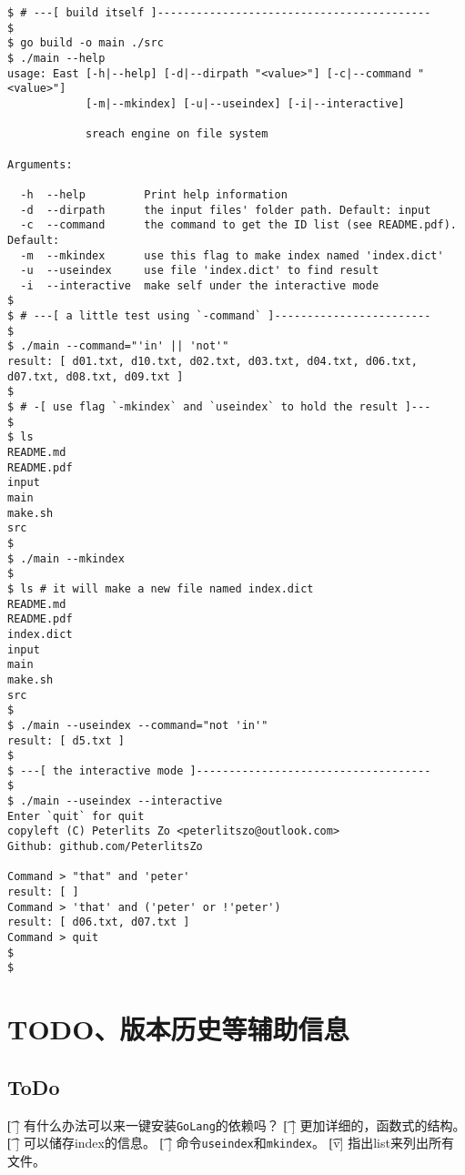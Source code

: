 \documentclass{peterlitsdoc}
\begin{document}
\begin{lstlisting}
$ # ---[ build itself ]------------------------------------------
$
$ go build -o main ./src
$ ./main --help
usage: East [-h|--help] [-d|--dirpath "<value>"] [-c|--command "<value>"]
            [-m|--mkindex] [-u|--useindex] [-i|--interactive]

            sreach engine on file system

Arguments:

  -h  --help         Print help information
  -d  --dirpath      the input files' folder path. Default: input
  -c  --command      the command to get the ID list (see README.pdf). Default: 
  -m  --mkindex      use this flag to make index named 'index.dict'
  -u  --useindex     use file 'index.dict' to find result
  -i  --interactive  make self under the interactive mode
$
$ # ---[ a little test using `-command` ]------------------------
$
$ ./main --command="'in' || 'not'"
result: [ d01.txt, d10.txt, d02.txt, d03.txt, d04.txt, d06.txt, d07.txt, d08.txt, d09.txt ]
$
$ # -[ use flag `-mkindex` and `useindex` to hold the result ]---
$
$ ls
README.md
README.pdf
input
main
make.sh
src
$
$ ./main --mkindex
$
$ ls # it will make a new file named index.dict
README.md
README.pdf
index.dict
input
main
make.sh
src
$
$ ./main --useindex --command="not 'in'"
result: [ d5.txt ]
$
$ ---[ the interactive mode ]------------------------------------
$
$ ./main --useindex --interactive
Enter `quit` for quit
copyleft (C) Peterlits Zo <peterlitszo@outlook.com>
Github: github.com/PeterlitsZo

Command > "that" and 'peter'
result: [ ]
Command > 'that' and ('peter' or !'peter')
result: [ d06.txt, d07.txt ]
Command > quit
$ 
$ 
\end{lstlisting}


\section{TODO、版本历史等辅助信息}

\subsection{ToDo}
\begin{plttodoenv}{1}
    \t[ ] 有什么办法可以来一键安装\verb|GoLang|的依赖吗？
    \t[ ] 更加详细的，函数式的结构。
    \t[ ] 可以储存index的信息。
    \t[ ] 命令\verb|useindex|和\verb|mkindex|。
    \t[v] 指出list来列出所有文件。
\end{plttodoenv}
\bigskip
\end{document}
